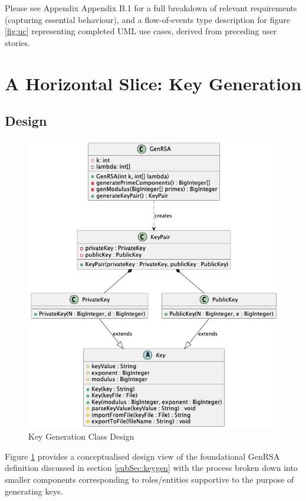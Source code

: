 \documentclass[]{final_report}
\theoremstyle{definition}
\begin{document}
Please see Appendix Appendix B.1 for a full breakdown of relevant requirements (capturing essential behaviour), and a flow-of-events type description for figure \ref{fig:uc} representing completed UML use cases, derived from preceding user stories.



\section{A Horizontal Slice: Key Generation}
\subsection{Design}
\begin{figure}[H]
    \centering
    \includegraphics[scale=0.48]{main_pictures/KeyGeneration.png}
    \caption{Key Generation Class Design}
    \label{fig:kg}
\end{figure}

Figure \ref{fig:kg} provides a conceptualised design view of the foundational GenRSA definition discussed in section  \ref{subSec:keygen} with the process broken down into smaller components corresponding to roles/entities supportive to the purpose of generating keys. 
\end{document}

